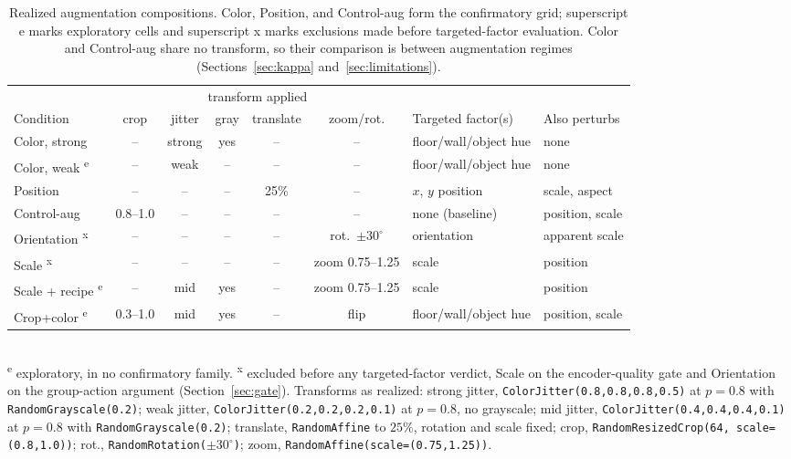 \documentclass[10pt]{article}
\begin{document}
\begin{table}[t]
\centering
\caption{Realized augmentation compositions. Color, Position, and Control-aug form the confirmatory
grid; superscript e marks exploratory cells and superscript x marks exclusions made before
targeted-factor evaluation. Color and Control-aug share no transform, so their comparison is between
augmentation regimes (Sections~\ref{sec:kappa} and~\ref{sec:limitations}).}
\label{tab:conditions}
\small
\setlength{\tabcolsep}{3.5pt}
\begin{tabular}{l ccccc l l}
\toprule
 & \multicolumn{5}{c}{transform applied} & & \\
\cmidrule(lr){2-6}
Condition & crop & jitter & gray & translate & zoom/rot. & Targeted factor(s) & Also perturbs \\
\midrule
Color, strong        & --      & strong & yes & --   & --       & floor/wall/object hue & none \\
Color, weak \textsuperscript{e} & --      & weak   & --  & --   & --       & floor/wall/object hue & none \\
Position              & --      & --     & --  & 25\% & --       & $x$, $y$ position     & scale, aspect \\
Control-aug           & 0.8--1.0 & --     & --  & --   & --       & none (baseline)       & position, scale \\
\midrule
Orientation \textsuperscript{x}  & --      & --     & --  & --   & rot.\ $\pm30^\circ$ & orientation & apparent scale \\
Scale \textsuperscript{x}        & --      & --     & --  & --   & zoom 0.75--1.25 & scale & position \\
Scale + recipe \textsuperscript{e} & --    & mid    & yes & --   & zoom 0.75--1.25 & scale & position \\
Crop+color \textsuperscript{e} & 0.3--1.0 & mid & yes & -- & flip & floor/wall/object hue & position, scale \\
\bottomrule
\end{tabular}
\\[2pt]
{\footnotesize \textsuperscript{e} exploratory, in no confirmatory family. \textsuperscript{x}
excluded before any targeted-factor verdict, Scale on the encoder-quality gate and Orientation on
the group-action argument (Section~\ref{sec:gate}). Transforms as realized: strong jitter,
\texttt{ColorJitter(0.8,0.8,0.8,0.5)} at $p=0.8$ with \texttt{RandomGrayscale(0.2)}; weak jitter,
\texttt{ColorJitter(0.2,0.2,0.2,0.1)} at $p=0.8$, no grayscale; mid jitter,
\texttt{ColorJitter(0.4,0.4,0.4,0.1)} at $p=0.8$ with \texttt{RandomGrayscale(0.2)}; translate,
\texttt{RandomAffine} to $25\%$, rotation and scale fixed; crop,
\texttt{RandomResizedCrop(64, scale=(0.8,1.0))}; rot., \texttt{RandomRotation($\pm30^\circ$)};
zoom, \texttt{RandomAffine(scale=(0.75,1.25))}.}
\end{table}
\end{document}
